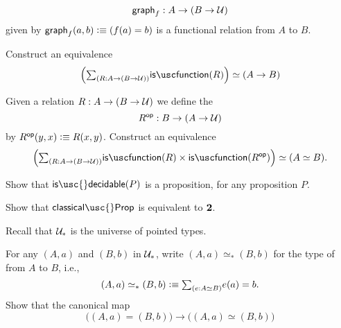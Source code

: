 \begin{exercises}
\begin{subexenum}
\begin{equation*}
\mathsf{graph}_f:A\to (B\to \mathcal{U})
\end{equation*}
given by $\mathsf{graph}_f(a,b)\vcentcolon\equiv (f(a)=b)$ is a functional relation from $A$ to $B$.
\item Construct an equivalence
\begin{equation*}
\eqv{\Big(\sm{R:A\to (B\to\UU)}\isfunction(R)\Big)}{(A\to B)}
\end{equation*}
\item Given a relation $R:A\to (B\to \mathcal{U})$ we define the 
\begin{equation*}
R^{\mathsf{op}} : B\to (A\to\mathcal{U})
\end{equation*}
by $R^{\mathsf{op}}(y,x)\vcentcolon\equiv R(x,y)$. Construct an equivalence
\begin{equation*}
\eqv{\Big(\sm{R:A\to (B\to \UU)}\isfunction(R)\times\isfunction(R^{\mathsf{op}})\Big)}{(\eqv{A}{B})}.
\end{equation*}
\end{subexenum}
\item
  \begin{subexenum}
  \item Show that $\mathsf{is\usc{}decidable}(P)$ is a proposition, for any proposition $P$.
  \item Show that $\mathsf{classical\usc{}Prop}$%
     is equivalent to $\mathbf{2}$.
  \end{subexenum}
\item Recall that $\mathcal{U}_\ast$ is the universe of pointed types.
  \begin{subexenum}
  \item For any $(A,a)$ and $(B,b)$ in $\mathcal{U}_\ast$, write $(A,a)\simeq_\ast(B,b)$ for the type of  from $A$ to $B$, i.e.,
    \begin{equation*}
      (A,a)\simeq_\ast (B,b)\defeq \sm{e:A\simeq B}e(a)=b.
    \end{equation*}
    Show that the canonical map
    \begin{equation*}
      \big((A,a)=(B,b)\big)\to \Big((A,a)\simeq (B,b)\Big)

\end{equation*}
\end{subexenum}
\end{exercises}
